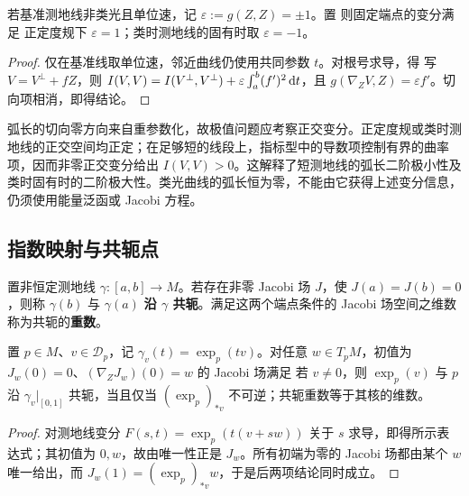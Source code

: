 \begin{corollary}[弧长与固有时的二阶变分]
    若基准测地线非类光且单位速，记 $\varepsilon:=g(Z,Z)=\pm1$。置
    则固定端点的变分满足
    正定度规下 $\varepsilon=1$；类时测地线的固有时取 $\varepsilon=-1$。
\end{corollary}
\begin{proof}
    仅在基准线取单位速，邻近曲线仍使用共同参数 $t$。对根号求导，得
    写 $V=V^\perp+fZ$，则 $I(V,V)=I(V^\perp,V^\perp)+\varepsilon\int_a^b(f')^2\,\dd t$，且 $g(\nabla_ZV,Z)=\varepsilon f'$。切向项相消，即得结论。
\end{proof}

\begin{remark}
    弧长的切向零方向来自重参数化，故极值问题应考察正交变分。正定度规或类时测地线的正交空间均正定；在足够短的线段上，指标型中的导数项控制有界的曲率项，因而非零正交变分给出 $I(V,V)>0$。这解释了短测地线的弧长二阶极小性及类时固有时的二阶极大性。类光曲线的弧长恒为零，不能由它获得上述变分信息，仍须使用能量泛函或 Jacobi 方程。
\end{remark}

\subsection{指数映射与共轭点}

\begin{definition}
    置非恒定测地线 $\gamma:[a,b]\to M$。若存在非零 Jacobi 场 $J$，使 $J(a)=J(b)=0$，则称 $\gamma(b)$ 与 $\gamma(a)$ \textbf{沿 $\gamma$ 共轭}。满足这两个端点条件的 Jacobi 场空间之维数称为共轭的\textbf{重数}。
\end{definition}

\begin{theorem}\label{thm:jacobi-exponential}
    置 $p\in M$、$v\in\mathcal D_p$，记 $\gamma_v(t)=\exp_p(tv)$。对任意 $w\in T_pM$，初值为 $J_w(0)=0$、$(\nabla_ZJ_w)(0)=w$ 的 Jacobi 场满足
    若 $v\ne0$，则 $\exp_p(v)$ 与 $p$ 沿 $\gamma_v|_{[0,1]}$ 共轭，当且仅当 $(\exp_p)_{*v}$ 不可逆；共轭重数等于其核的维数。
\end{theorem}
\begin{proof}
    对测地线变分 $F(s,t)=\exp_p(t(v+sw))$ 关于 $s$ 求导，即得所示表达式；其初值为 $0,w$，故由唯一性正是 $J_w$。所有初端为零的 Jacobi 场都由某个 $w$ 唯一给出，而 $J_w(1)=(\exp_p)_{*v}w$，于是后两项结论同时成立。
\end{proof}

